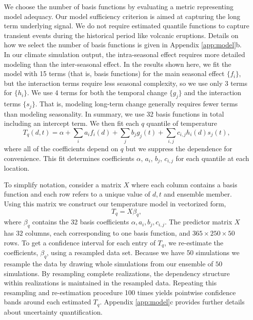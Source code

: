 \documentclass{ametsoc}
\begin{document}
We choose the number of basis functions by evaluating a metric representing model adequacy. Our model sufficiency criterion is aimed at capturing the long term underlying signal. We do not require estimated quantile functions to capture transient events during the historical period like volcanic eruptions. Details on how we select the number of basis functions is given in Appendix \ref{app:model}b. In our climate simulation output, the intra-seasonal effect requires more detailed modeling than the inter-seasonal effect. In the results shown here, we fit the model with 15 terms (that is, basis functions) for the main seasonal effect $\{f_i\}$, but the interaction terms require less seasonal complexity, so we use only 3 terms for $\{h_i\}$.  
We use 4 terms for both the temporal change $\{g_j\}$ and the interaction terms $\{s_j\}$. 
That is, modeling long-term change generally requires fewer terms than modeling seasonality. In summary, we use 32 basis functions in total including an intercept term. We then fit each $q$ quantile of temperature %
\begin{equation}
T_q(d, t) = \alpha + \sum_ia_if_i(d) + \sum_jb_j g_j(t) + \sum_{i,j}c_{i,j} h_i(d)s_j(t),
\end{equation}
 where all of the coefficients depend on $q$ but we suppress the dependence for convenience. This fit determines coefficients $\alpha$, $a_i$, $b_j$, $c_{i,j}$ for each quantile at each location.

To simplify notation, consider a matrix $X$ where each column contains a basis function and each row refers to a unique value of $d, t$ and ensemble member. Using this matrix we construct our temperature model in vectorized form,
 \begin{equation}
 \label{eq:matrix_version}
 T_q = X\beta_q, 
 \end{equation}
 where $\beta_q$ contains the 32 basis coefficients $\alpha, a_i, b_j, c_{i,j}$. The predictor matrix $X$ has $32$ columns, each corresponding to one basis function, and $365 \times 250 \times 50$ rows. To get a confidence interval for each entry of $T_q$, we re-estimate the coefficients, $\beta_q$, using a resampled data set. Because we have 50 simulations we resample the data by drawing whole simulations from our ensemble of $50$ simulations. By resampling complete realizations, the dependency structure within realizations is maintained in the resampled data. Repeating this resampling and re-estimation procedure 100 times yields pointwise confidence bands around each estimated $T_q$. Appendix \ref{app:model}c provides further details about uncertainty quantification. 
\end{document}
